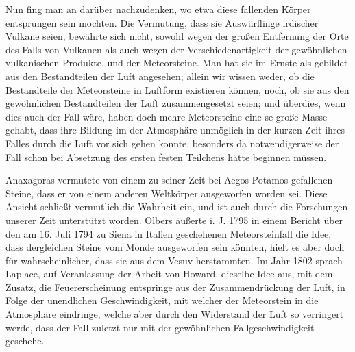\documentclass[a4paper, 11pt, oneside]{article}
\begin{document}
Nun fing man an darüber nachzudenken, wo etwa diese fallenden Körper entsprungen sein mochten. Die Vermutung, dass sie Auswürflinge irdischer Vulkane seien, bewährte sich nicht, sowohl wegen der großen Entfernung der Orte des Falls von Vulkanen als auch wegen der Verschiedenartigkeit der gewöhnlichen vulkanischen Produkte. und der Meteorsteine. Man hat sie im Ernste als gebildet aus den Bestandteilen der Luft angesehen; allein wir wissen weder, ob die Bestandteile der Meteorsteine in Luftform existieren können, noch, ob sie aus den gewöhnlichen Bestandteilen der Luft zusammengesetzt seien; und überdies, wenn dies auch der Fall wäre, haben doch mehre Meteorsteine eine se große Masse gehabt, dass ihre Bildung im der Atmosphäre unmöglich in der kurzen Zeit ihres Falles durch die Luft vor sich gehen konnte, besonders da notwendigerweise der Fall schon bei Absetzung des ersten festen Teilchens hätte beginnen müssen.

Anaxagoras vermutete von einem zu seiner Zeit bei Aegos Potamos gefallenen Steine, dass er von einem anderen Weltkörper ausgeworfen worden sei. Diese Ansicht schließt vermutlich die Wahrheit ein, und ist auch durch die Forschungen unserer Zeit unterstützt worden. Olbers äußerte i. J. 1795 in einem Bericht über den am 16. Juli 1794 zu Siena in Italien geschehenen Meteorsteinfall die Idee, dass dergleichen Steine vom Monde ausgeworfen sein könnten, hielt es aber doch für wahrscheinlicher, dass sie aus dem Vesuv herstammten. Im Jahr 1802 sprach Laplace, auf Veranlassung der Arbeit von Howard, dieselbe Idee aus, mit dem Zusatz, die Feuererscheinung entspringe aus der Zusammendrückung der Luft, in Folge der unendlichen Geschwindigkeit, mit welcher der Meteorstein in die Atmosphäre eindringe, welche aber durch den Widerstand der Luft so verringert werde, dass der Fall zuletzt nur mit der gewöhnlichen Fallgeschwindigkeit geschehe.
\end{document}
